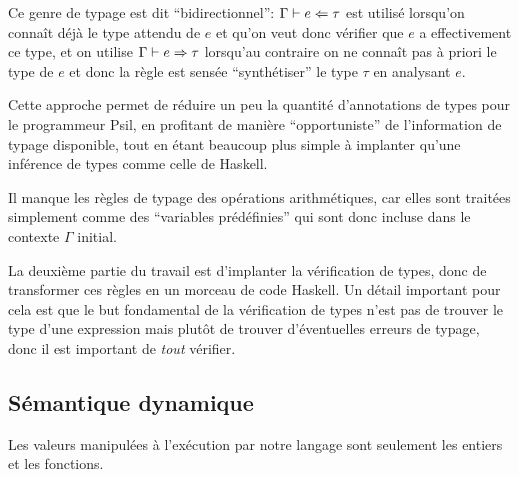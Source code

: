 \documentclass{article}
\begin{document}
Ce genre de typage est dit ``bidirectionnel'': $\Gamma \vdash e \Leftarrow{\tau}$ est
utilisé lorsqu'on connaît déjà le type attendu de $e$ et qu'on veut donc
vérifier que $e$ a effectivement ce type, et on utilise $\Gamma \vdash e \Rightarrow{\tau}$
lorsqu'au contraire on ne connaît pas à priori le type de $e$ et donc la
règle est sensée ``synthétiser'' le type $\tau$ en analysant $e$.

Cette approche permet de réduire un peu la quantité d'annotations de types
pour le programmeur Psil, en profitant de manière ``opportuniste'' de
l'information de typage disponible, tout en étant beaucoup plus simple
à implanter qu'une inférence de types comme celle de Haskell.

Il manque les règles de typage des opérations arithmétiques, car elles sont
traitées simplement comme des ``variables prédéfinies'' qui
sont donc incluse dans le contexte $\Gamma$ initial.

La deuxième partie du travail est d'implanter la vérification de types, donc
de transformer ces règles en un morceau de code Haskell.  Un détail
important pour cela est que le but fondamental de la vérification de types
n'est pas de trouver le type d'une expression mais plutôt de trouver
d'éventuelles erreurs de typage, donc il est important de \emph{tout} vérifier.

\subsection{Sémantique dynamique}

Les valeurs manipulées à l'exécution par notre langage sont seulement les
entiers et les fonctions.
\end{document}
